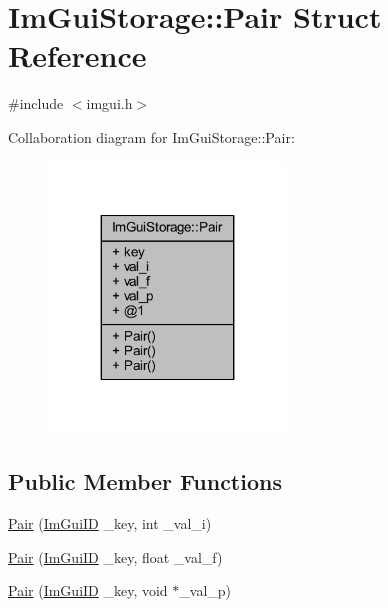 \hypertarget{struct_im_gui_storage_1_1_pair}{}\section{Im\+Gui\+Storage\+:\+:Pair Struct Reference}
\label{struct_im_gui_storage_1_1_pair}


{\ttfamily \#include $<$imgui.\+h$>$}



Collaboration diagram for Im\+Gui\+Storage\+:\+:Pair\+:
\nopagebreak
\begin{figure}[H]
\begin{center}
\leavevmode
\includegraphics[width=179pt]{struct_im_gui_storage_1_1_pair__coll__graph}
\end{center}
\end{figure}
\subsection*{Public Member Functions}
\begin{DoxyCompactItemize}
\item 
\mbox{\hyperlink{struct_im_gui_storage_1_1_pair_a37542a22048f0af35e5a6beda6900a0e}{Pair}} (\mbox{\hyperlink{imgui_8h_a1785c9b6f4e16406764a85f32582236f}{Im\+Gui\+ID}} \+\_\+key, int \+\_\+val\+\_\+i)
\item 
\mbox{\hyperlink{struct_im_gui_storage_1_1_pair_a6f63f598513f2a7a57f2e9ea3b0137b9}{Pair}} (\mbox{\hyperlink{imgui_8h_a1785c9b6f4e16406764a85f32582236f}{Im\+Gui\+ID}} \+\_\+key, float \+\_\+val\+\_\+f)
\item 
\mbox{\hyperlink{struct_im_gui_storage_1_1_pair_a4d07d60f83b4e24ee8be9ccceaab76bd}{Pair}} (\mbox{\hyperlink{imgui_8h_a1785c9b6f4e16406764a85f32582236f}{Im\+Gui\+ID}} \+\_\+key, void $\ast$\+\_\+val\+\_\+p)
\end{DoxyCompactItemize}
